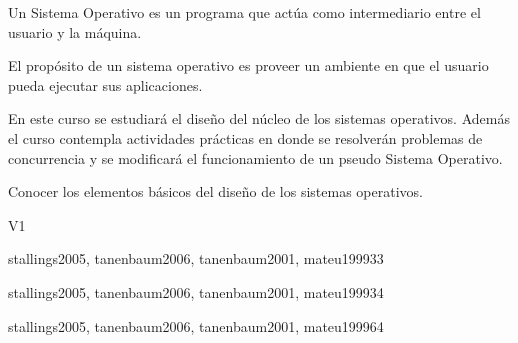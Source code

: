 \begin{syllabus}


\begin{justification}
    Un Sistema Operativo es un programa que actúa como intermediario entre el usuario y la máquina.
    
    El propósito de un sistema operativo es proveer un ambiente en que el usuario pueda ejecutar sus aplicaciones.
    
    En este curso se estudiará el diseño del núcleo de los sistemas operativos.
    Además el curso contempla actividades prácticas en donde se resolverán problemas de 
    concurrencia y se modificará el funcionamiento de un pseudo Sistema Operativo.
    \end{justification}
    
    \begin{goals}
    \item Conocer los elementos básicos del diseño de los sistemas operativos.
    \end{goals}
    
    \begin{outcomes}{V1}
        \item {}
        \item {}
        \item {}
        \item {}
    \end{outcomes}
    
    \begin{unit}{\ALAlgorithmicStrategies}{}{stallings2005, tanenbaum2006, tanenbaum2001, mateu1999}{3}{3}
        \ALAlgorithmicStrategiesAllTopics
        \ALAlgorithmicStrategiesAllLearningOutcomes
    \end{unit}
    
    \begin{unit}{\OSOverviewofOperatingSystems}{}{stallings2005, tanenbaum2006, tanenbaum2001, mateu1999}{3}{4}
        \OSOverviewofOperatingSystemsAllTopics
        \OSOverviewofOperatingSystemsAllLearningOutcomes
    \end{unit}
    
    \begin{unit}{\OSOperatingSystemPrinciples}{}{stallings2005, tanenbaum2006, tanenbaum2001, mateu1999}{6}{4}
        \OSOperatingSystemPrinciplesAllTopics
        \OSOperatingSystemPrinciplesAllLearningOutcomes
    \end{unit}
    

\end{syllabus}
